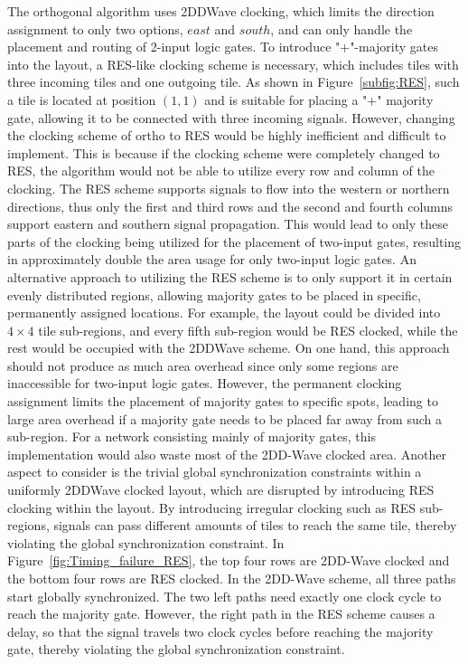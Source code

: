 The orthogonal algorithm uses 2DDWave clocking, which limits the direction assignment to only two options, $east$ and $south$, and can only handle the placement and routing of 2-input logic gates. To introduce "+"-majority gates into the layout, a RES-like clocking scheme is necessary, which includes tiles with three incoming tiles and one outgoing tile. As shown in Figure~\ref{subfig:RES}, such a tile is located at position $(1, 1)$ and is suitable for placing a "+" majority gate, allowing it to be connected with three incoming signals. However, changing the clocking scheme of ortho to RES would be highly inefficient and difficult to implement. This is because if the clocking scheme were completely changed to RES, the algorithm would not be able to utilize every row and column of the clocking. The RES scheme supports signals to flow into the western or northern directions, thus only the first and third rows and the second and fourth columns support eastern and southern signal propagation. This would lead to only these parts of the clocking being utilized for the placement of two-input gates, resulting in approximately double the area usage for only two-input logic gates.
An alternative approach to utilizing the RES scheme is to only support it in certain evenly distributed regions, allowing majority gates to be placed in specific, permanently assigned locations. For example, the layout could be divided into $4\times4$ tile sub-regions, and every fifth sub-region would be RES clocked, while the rest would be occupied with the 2DDWave scheme. On one hand, this approach should not produce as much area overhead since only some regions are inaccessible for two-input logic gates. However, the permanent clocking assignment limits the placement of majority gates to specific spots, leading to large area overhead if a majority gate needs to be placed far away from such a sub-region. For a network consisting mainly of majority gates, this implementation would also waste most of the 2DD-Wave clocked area. Another aspect to consider is the trivial global synchronization constraints within a uniformly 2DDWave clocked layout, which are disrupted by introducing RES clocking within the layout. By introducing irregular clocking such as RES sub-regions, signals can pass different amounts of tiles to reach the same tile, thereby violating the global synchronization constraint. In Figure~\ref{fig:Timing_failure_RES}, the top four rows are 2DD-Wave clocked and the bottom four rows are RES clocked. In the 2DD-Wave scheme, all three paths start globally synchronized. The two left paths need exactly one clock cycle to reach the majority gate. However, the right path in the RES scheme causes a delay, so that the signal travels two clock cycles before reaching the majority gate, thereby violating the global synchronization constraint.

